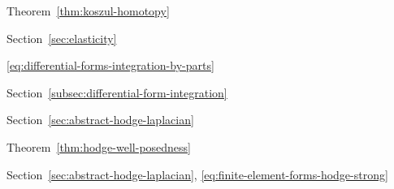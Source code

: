 \par\noindent\hspace*{0em}\label{index:homotopy-formula}\quad Theorem~\ref{thm:koszul-homotopy}

\par\noindent\hspace*{0em}\label{index:incompatibility-operator}\quad Section~\ref{sec:elasticity}

\par\noindent\hspace*{0em}\label{index:integration-by-parts}\quad \eqref{eq:differential-forms-integration-by-parts}

\par\noindent\hspace*{0em}\label{index:integration-of-differential-forms}\quad Section~\ref{subsec:differential-form-integration}

\par\noindent\hspace*{0em}\label{index:laplacian}

\par\noindent\hspace*{1em}\label{index:laplacian-abstract-hodge}\quad Section~\ref{sec:abstract-hodge-laplacian}

\par\noindent\hspace*{2em}\label{index:laplacian-abstract-hodge-well-posedness-of}\quad Theorem~\ref{thm:hodge-well-posedness}

\par\noindent\hspace*{1em}\label{index:laplacian-hodge}\quad Section~\ref{sec:abstract-hodge-laplacian}, \eqref{eq:finite-element-forms-hodge-strong}

